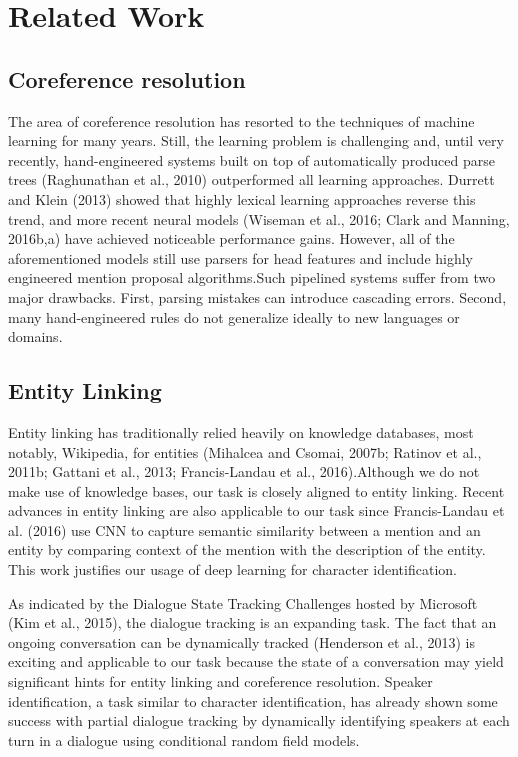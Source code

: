 \documentclass[11pt]{article}
\begin{document}
\section{Related Work}
\subsection{Coreference resolution}
The area of coreference resolution has resorted to the techniques of machine learning for many years. Still, the learning problem is challenging and, until very recently, hand-engineered systems built on top of automatically produced parse trees (Raghunathan et al., 2010) outperformed all learning approaches. Durrett and Klein (2013) showed that highly lexical learning approaches reverse this trend, and more recent neural models (Wiseman et al., 2016; Clark and Manning, 2016b,a) have achieved noticeable performance gains. However, all of the aforementioned models still use parsers for head features and include highly engineered mention proposal algorithms.Such pipelined systems suffer from two major drawbacks. First, parsing mistakes can introduce cascading errors. Second, many hand-engineered rules do not generalize ideally to new languages or domains.  

\subsection{Entity Linking}

Entity linking has traditionally relied heavily on knowledge databases, most notably, Wikipedia, for entities (Mihalcea and Csomai, 2007b; Ratinov et al., 2011b; Gattani et al., 2013; Francis-Landau et al., 2016).Although we do not make use of knowledge bases, our task is closely aligned to entity linking. Recent advances in entity linking are also applicable to our task since Francis-Landau et al. (2016) use CNN to capture semantic similarity between a mention and an entity by comparing context of the mention with the description of the entity. This work justifies our usage of deep learning for character identification.

As indicated by the Dialogue State Tracking Challenges hosted by Microsoft (Kim et al., 2015), the dialogue tracking is an expanding task. The fact that an ongoing conversation can be dynamically tracked (Henderson et al., 2013) is exciting and applicable to our task because the state of a conversation may yield significant hints for entity linking and coreference resolution. Speaker identification, a task similar to character identification, has already shown some success with partial dialogue tracking by dynamically identifying speakers at each turn in a dialogue using conditional random field models.
\end{document}
